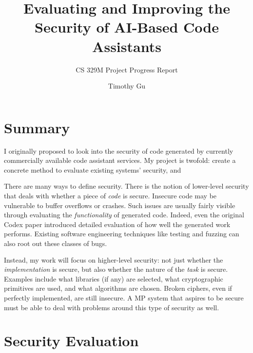 \documentclass[10pt,sigplan,screen,nonacm]{acmart}
\begin{document}
\title{Evaluating and Improving the Security of AI-Based Code Assistants}
\subtitle{CS 329M Project Progress Report}

\author{Timothy Gu}

\renewcommand{\shorttitle}{CS 329M Project Proposal}
\renewcommand{\shortauthors}{Gu}

\ifluatex
\renewcommand{\checkmark}{✔}
\fi

\maketitle

\section{Summary}

I originally proposed to look into the security of code generated by currently commercially available code assistant services. My project is twofold: create a concrete method to evaluate existing systems' security, and 

There are many ways to define security. There is the notion of lower-level security that deals with whether a piece of \emph{code} is secure. Insecure code may be vulnerable to buffer overflows or crashes. Such issues are usually fairly visible through evaluating the \emph{functionality} of generated code. Indeed, even the original Codex paper \cite{Chen2021EvaluatingLL} introduced detailed evaluation of how well the generated work performs. Existing software engineering techniques like testing and fuzzing can also root out these classes of bugs.

Instead, my work will focus on higher-level security: not just whether the \emph{implementation} is secure, but also whether the nature of the \emph{task} is secure. Examples include what libraries (if any) are selected, what cryptographic primitives are used, and what algorithms are chosen. Broken ciphers, even if perfectly implemented, are still insecure. A MP system that aspires to be secure must be able to deal with problems around this type of security as well.

\section{Security Evaluation}
\end{document}
